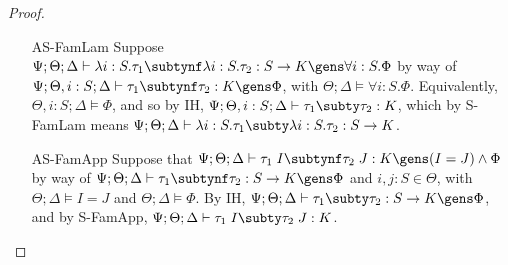 \begin{proof}
\begin{itemize}
  \item[AS-FamLam] Suppose $\Psi ; \Theta ; \Delta \vdash \lambda i : S. \tau_1 \subtynf \lambda i : S. \tau_2 : S \to K \gens \forall i : S. \Phi$ by way of ${\Psi ; \Theta, i : S ; \Delta \vdash \tau_1 \subtynf \tau_2 : K \gens \Phi}$, with $\Theta ; \Delta \vDash \forall i : S. \Phi$. Equivalently, $\Theta, i : S; \Delta \vDash \Phi$, and so by IH, $\Psi ; \Theta, i : S ; \Delta \vdash \tau_1 \subty \tau_2 : K$, which by S-FamLam means $\Psi ; \Theta ; \Delta \vdash \lambda i : S. \tau_1 \subty \lambda i : S. \tau_2 : S \to K $.
  \item[AS-FamApp] Suppose that $\Psi ; \Theta ; \Delta \vdash \tau_1 \; I \subtynf \tau_2 \; J : K \gens (I = J) \wedge \Phi$ by way of $\Psi ; \Theta ; \Delta \vdash \tau_1 \subtynf \tau_2 : S \to K \gens \Phi$ and $i,j : S  \in \Theta$, with $\Theta ; \Delta \vDash I = J$ and $\Theta ; \Delta \vDash \Phi$. By IH, $\Psi ; \Theta ; \Delta \vdash \tau_1 \subty \tau_2 : S \to K \gens \Phi$, and by S-FamApp, $\Psi ; \Theta ; \Delta \vdash \tau_1 \; I \subty \tau_2 \; J : K$.
\end{itemize}

\end{proof}